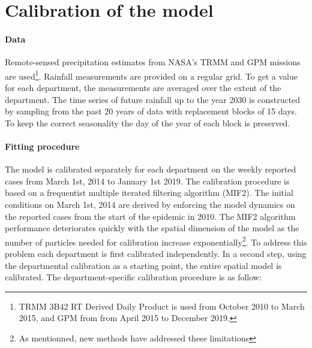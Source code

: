 \section{Calibration of the model}
\paragraph{Data} Remote-sensed precipitation estimates from NASA's TRMM and GPM missions are used\footnote{TRMM 3B42 RT Derived Daily Product \parencite{Huffman:TRMMMultisatellitePrecipitation:2007} is used from October 2010 to March 2015,  and GPM from from April 2015 to December 2019.}. Rainfall measurements are provided on a regular grid. To get a value for each department, the measurements are averaged over the extent of the department. The time series of future rainfall up to the year 2030 is constructed by sampling from the past 20 years of data  with replacement blocks of 15 days. To keep the correct seasonality the day of the year of each block is preserved.

\paragraph{Fitting procedure} The model is calibrated separately for each department on the weekly reported cases from March 1st, 2014 to January 1st 2019. The calibration procedure is based on a frequentist multiple iterated filtering algorithm (MIF2)\cite{Ionides:InferenceDynamicLatent:2015}. The initial conditions on March 1st, 2014 are derived by enforcing the model dynamics on the reported cases from the start of the epidemic in 2010. The MIF2 algorithm performance deteriorates quickly with the spatial dimension of the model as the number of particles needed for calibration increase exponentially\cite{Park:GuidedIntermediateResampling:2017}\footnote{As mentionned, new methods have addressed these limitations\parencite{Asfaw:PartiallyObservedMarkov:2021, Park:InferenceHighdimensionalImplicit:2020}}. To address this problem each department is first calibrated independently. In a second step, using the departmental calibration as a starting point, the entire spatial model is calibrated.
The department-specific calibration procedure is as follow:


